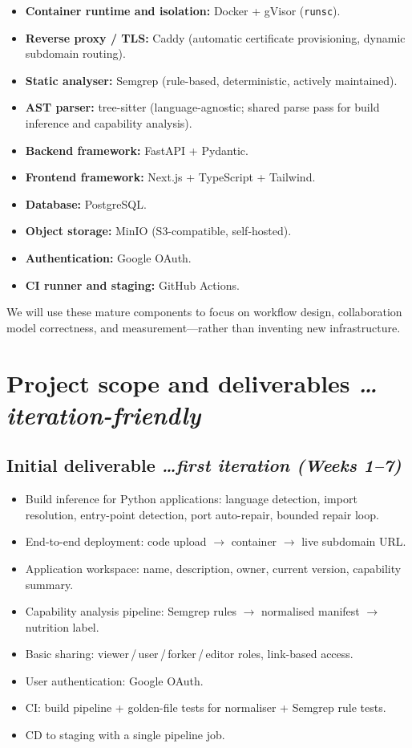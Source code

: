 \documentclass[11pt,a4paper]{article}
\newcommand{\BvrHint}[1]{%
{\normalfont\normalsize\itshape\hfill #1}}
\begin{document}
\begin{itemize}[leftmargin=0.7cm]
  \item \textbf{Container runtime and isolation:} Docker + gVisor (\texttt{runsc}).
  \item \textbf{Reverse proxy / TLS:} Caddy (automatic certificate provisioning,
    dynamic subdomain routing).
  \item \textbf{Static analyser:} Semgrep (rule-based, deterministic, actively
    maintained).
  \item \textbf{AST parser:} tree-sitter (language-agnostic; shared parse pass for
    build inference and capability analysis).
  \item \textbf{Backend framework:} FastAPI + Pydantic.
  \item \textbf{Frontend framework:} Next.js + TypeScript + Tailwind.
  \item \textbf{Database:} PostgreSQL.
  \item \textbf{Object storage:} MinIO (S3-compatible, self-hosted).
  \item \textbf{Authentication:} Google OAuth.
  \item \textbf{CI runner and staging:} GitHub Actions.
\end{itemize}

We will use these mature components to focus on workflow design, collaboration model
correctness, and measurement---rather than inventing new infrastructure.

\section{Project scope and deliverables %
\BvrHint{\ldots iteration-friendly}}

\subsection{Initial deliverable %
\BvrHint{\ldots first iteration (Weeks 1--7)}}

\begin{itemize}[leftmargin=0.7cm]
  \item Build inference for Python applications: language detection, import resolution,
    entry-point detection, port auto-repair, bounded repair loop.
  \item End-to-end deployment: code upload $\to$ container $\to$ live subdomain URL.
  \item Application workspace: name, description, owner, current version, capability
    summary.
  \item Capability analysis pipeline: Semgrep rules $\to$ normalised manifest $\to$
    nutrition label.
  \item Basic sharing: viewer\,/\,user\,/\,forker\,/\,editor roles, link-based
    access.
  \item User authentication: Google OAuth.
  \item CI: build pipeline + golden-file tests for normaliser + Semgrep rule tests.
  \item CD to staging with a single pipeline job.
\end{itemize}
\end{document}
